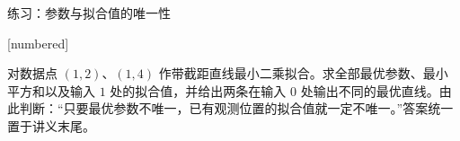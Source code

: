 \documentclass[aspectratio=169,10pt,fontset=fandol]{ctexbeamer}
\makeatletter
\newcommand{\mathagentexerciselabelcontext}[1]{%
\hypertarget<1>{#1}{}%
\edef\@currentHref{#1}%
}
\makeatother
\begin{document}
\begin{frame}[t,fragile]{练习：参数与拟合值的唯一性}
\normalsize
{\normalsize
[numbered]
\mathagentexerciselabelcontext{mathagent.exercise.U0051.0}
\begin{exercise}
\label{mathagent:exercise:2a86525c0362bd6004ffb20b570bb82a80598d07bb305d4bd130c7cd7cc87533}
对数据点 $(1,2)$、$(1,4)$ 作带截距直线最小二乘拟合。求全部最优参数、最小平方和以及输入 $1$ 处的拟合值，并给出两条在输入 $0$ 处输出不同的最优直线。由此判断：“只要最优参数不唯一，已有观测位置的拟合值就一定不唯一。”答案统一置于讲义末尾。
\end{exercise}
}
\end{frame}
\end{document}
